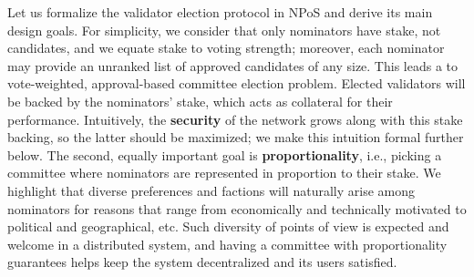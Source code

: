 Let us formalize the validator election protocol in NPoS and derive its main design goals. 
For simplicity, we consider that only nominators have stake, not candidates, and we equate stake to voting strength; moreover, each nominator may provide an unranked list of approved candidates of any size. This leads a to vote-weighted, approval-based committee election problem. 
Elected validators will be backed by the nominators' stake, which acts as collateral for their performance. 
Intuitively, the \textbf{security} of the network grows along with this stake backing, so the latter should be maximized; we make this intuition formal further below. 
The second, equally important goal is \textbf{proportionality}, i.e., picking a committee where nominators are represented in proportion to their stake. 
We highlight that diverse preferences and factions will naturally arise among nominators for reasons that range from economically and technically motivated to political and geographical, etc. 
Such diversity of points of view is expected and welcome in a distributed system, and having a committee with proportionality guarantees helps keep the system decentralized and its users satisfied.

